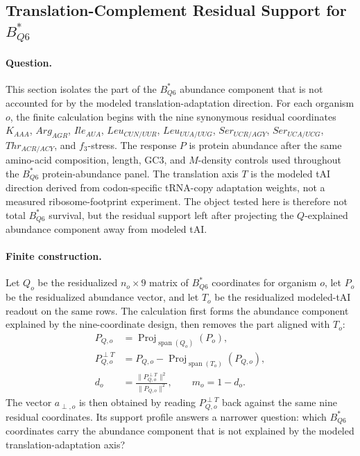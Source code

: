 \subsection{Translation-Complement Residual Support for $B^*_{Q6}$}
\label{sec:bior-bstarq6-translation-complement-residual-support}

\paragraph{Question.}
This section isolates the part of the $B^*_{Q6}$ abundance component that is not accounted for by the modeled translation-adaptation direction.  For each organism $o$, the finite calculation begins with the nine synonymous residual coordinates
$K_{AAA}$, $Arg_{AGR}$, $Ile_{AUA}$, $Leu_{CUN/UUR}$, $Leu_{UUA/UUG}$, $Ser_{UCR/AGY}$, $Ser_{UCA/UCG}$, $Thr_{ACR/ACY}$, and $f_3$-stress.  The response $P$ is protein abundance after the same amino-acid composition, length, GC3, and $M$-density controls used throughout the $B^*_{Q6}$ protein-abundance panel.  The translation axis $T$ is the modeled tAI direction derived from codon-specific tRNA-copy adaptation weights, not a measured ribosome-footprint experiment.  The object tested here is therefore not total $B^*_{Q6}$ survival, but the residual support left after projecting the $Q$-explained abundance component away from modeled tAI.

\paragraph{Finite construction.}
Let $Q_o$ be the residualized $n_o \times 9$ matrix of $B^*_{Q6}$ coordinates for organism $o$, let $P_o$ be the residualized abundance vector, and let $T_o$ be the residualized modeled-tAI readout on the same rows.  The calculation first forms the abundance component explained by the nine-coordinate design, then removes the part aligned with $T_o$:
$$
\begin{aligned}
P_{Q,o} &= \operatorname{Proj}_{\operatorname{span}(Q_o)}(P_o),\\
P_{Q,o}^{\perp T} &= P_{Q,o}-\operatorname{Proj}_{\operatorname{span}(T_o)}(P_{Q,o}),\\
d_o &= \frac{\|P_{Q,o}^{\perp T}\|^2}{\|P_{Q,o}\|^2},
\qquad
m_o = 1-d_o .
\end{aligned}
$$
The vector $a_{\perp,o}$ is then obtained by reading $P_{Q,o}^{\perp T}$ back against the same nine residual coordinates.  Its support profile answers a narrower question: which $B^*_{Q6}$ coordinates carry the abundance component that is not explained by the modeled translation-adaptation axis?

